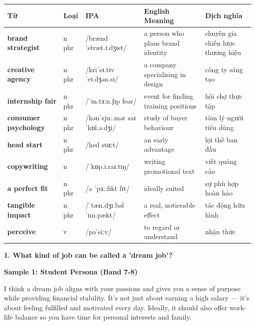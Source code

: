\vspace{0.8em}
\begin{center}
\renewcommand{\arraystretch}{1.65}
\begin{tabularx}{\textwidth}{|V{0.22\textwidth}|C{0.07\textwidth}|I{0.20\textwidth}|Y|V{0.18\textwidth}|}
\hline
{}
\textbf{Từ} & \textbf{Loại} & \textbf{IPA} & \textbf{English Meaning} & \textbf{Dịch nghĩa} \\
\hline
\textbf{brand strategist} & n phr & /brænd ˈstræt.ɪ.dʒɪst/ & a person who plans brand identity & chuyên gia chiến lược thương hiệu \\ \hline
\textbf{creative agency} & n phr & /kriˈeɪ.tɪv ˈeɪ.dʒən.si/ & a company specialising in design & công ty sáng tạo \\ \hline
\textbf{internship fair} & n phr & /ˈɪn.tɜːn.ʃɪp feər/ & event for finding training positions & hội chợ thực tập \\ \hline
\textbf{consumer psychology} & n phr & /kənˈsjuː.mər saɪˈkɒl.ə.dʒi/ & study of buyer behaviour & tâm lý người tiêu dùng \\ \hline
\textbf{head start} & n phr & /hed stɑːt/ & an early advantage & lợi thế ban đầu \\ \hline
\textbf{copywriting} & n & /ˈkɒp.i.raɪ.tɪŋ/ & writing promotional text & viết quảng cáo \\ \hline
\textbf{a perfect fit} & n phr & /ə ˈpɜː.fɪkt fɪt/ & ideally suited & sự phù hợp hoàn hảo \\ \hline
\textbf{tangible impact} & n phr & /ˈtæn.dʒɪ.bəl ˈɪm.pækt/ & a real, noticeable effect & tác động hữu hình \\ \hline
\textbf{perceive} & v & /pəˈsiːv/ & to regard or understand & nhận thức \\ \hline
\end{tabularx}
\end{center}

\partthreeheader

\begin{ieltsquestion}
\textbf{1. What kind of job can be called a 'dream job'?}
\end{ieltsquestion}
\textbf{Sample 1: Student Persona (Band 7-8)}

I think a dream job aligns with your passions and gives you a sense of purpose while providing financial stability. It's not just about earning a high salary — it's about feeling fulfilled and motivated every day. Ideally, it should also offer work-life balance so you have time for personal interests and family.

